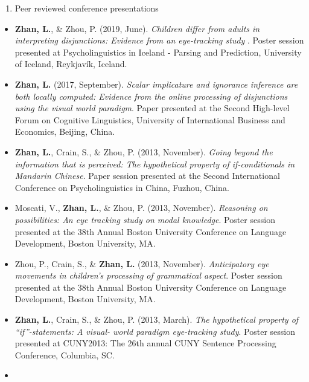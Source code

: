 \documentclass[12pt,]{article}
\providecommand{\tightlist}{%
  \setlength{\itemsep}{0pt}\setlength{\parskip}{0pt}}
\begin{document}
\begin{enumerate}
\def\labelenumi{\arabic{enumi}.}
\setcounter{enumi}{3}
\tightlist
\item
  Peer reviewed conference presentations
\end{enumerate}

\begin{itemize}
\item
  \textbf{Zhan, L.}, \& Zhou, P. (2019, June). \emph{Children differ
  from adults in interpreting disjunctions: Evidence from an
  eye-tracking study }. Poster session presented at Psycholinguistics in
  Iceland - Parsing and Prediction, University of Iceland, Reykjavík,
  Iceland. \href{https://publications.likan.info/Talks/PIPP_Poster.pdf}{
  \faFilePdf[regular] }
\item
  \textbf{Zhan, L.} (2017, September). \emph{Scalar implicature and
  ignorance inference are both locally computed: Evidence from the
  online processing of disjunctions using the visual world paradigm}.
  Paper presented at the Second High-level Forum on Cognitive
  Linguistics, University of International Business and Economics,
  Beijing, China.
  \href{https://publications.likan.info/Talks/ZhanL2017UIBE.pdf}{
  \faFilePdf[regular] }
\item
  \textbf{Zhan, L.}, Crain, S., \& Zhou, P. (2013, November).
  \emph{Going beyond the information that is perceived: The hypothetical
  property of if-conditionals in Mandarin Chinese}. Paper session
  presented at the Second International Conference on Psycholinguistics
  in China, Fuzhou, China.
\item
  Moscati, V., \textbf{Zhan, L.}, \& Zhou, P. (2013, November).
  \emph{Reasoning on possibilities: An eye tracking study on modal
  knowledge}. Poster session presented at the 38th Annual Boston
  University Conference on Language Development, Boston University, MA.
\item
  Zhou, P., Crain, S., \& \textbf{Zhan, L.} (2013, November).
  \emph{Anticipatory eye movements in children's processing of
  grammatical aspect}. Poster session presented at the 38th Annual
  Boston University Conference on Language Development, Boston
  University, MA.
\item
  \textbf{Zhan, L.}, Crain, S., \& Zhou, P. (2013, March). \emph{The
  hypothetical property of ``if''-statements: A visual- world paradigm
  eye-tracking study}. Poster session presented at CUNY2013: The 26th
  annual CUNY Sentence Processing Conference, Columbia, SC.
\item

\end{itemize}
\end{document}
